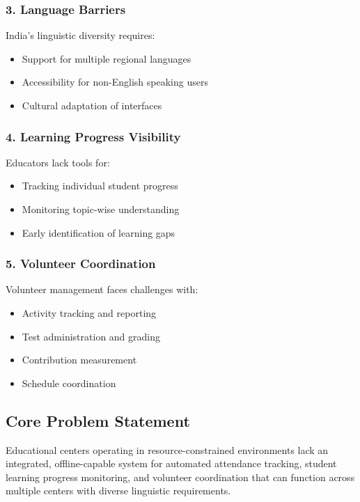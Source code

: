 \documentclass[12pt,a4paper]{article}
\begin{document}
\subsubsection{3. Language Barriers}
India's linguistic diversity requires:
\begin{itemize}[leftmargin=*, itemsep=0.2em]
    \item Support for multiple regional languages
    \item Accessibility for non-English speaking users
    \item Cultural adaptation of interfaces
\end{itemize}

\subsubsection{4. Learning Progress Visibility}
Educators lack tools for:
\begin{itemize}[leftmargin=*, itemsep=0.2em]
    \item Tracking individual student progress
    \item Monitoring topic-wise understanding
    \item Early identification of learning gaps
\end{itemize}

\subsubsection{5. Volunteer Coordination}
Volunteer management faces challenges with:
\begin{itemize}[leftmargin=*, itemsep=0.2em]
    \item Activity tracking and reporting
    \item Test administration and grading
    \item Contribution measurement
    \item Schedule coordination
\end{itemize}

\subsection{Core Problem Statement}
\begin{tcolorbox}[colback=lightgray, colframe=primary, title=\textbf{Core Problem}, fonttitle=\bfseries, arc=2mm, boxrule=1pt]
Educational centers operating in resource-constrained environments lack an integrated, offline-capable system for automated attendance tracking, student learning progress monitoring, and volunteer coordination that can function across multiple centers with diverse linguistic requirements.
\end{tcolorbox}
\end{document}
